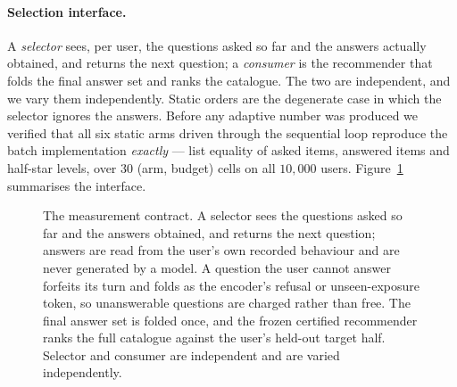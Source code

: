 \documentclass[11pt]{article}
\begin{document}
\paragraph{Selection interface.} A \emph{selector} sees, per user, the questions asked so far and
the answers actually obtained, and returns the next question; a \emph{consumer} is the recommender
that folds the final answer set and ranks the catalogue. The two are independent, and we vary them
independently. Static orders are the degenerate case in which the selector ignores the answers.
Before any adaptive number was produced we verified that all six static arms driven through the
sequential loop reproduce the batch implementation \emph{exactly} --- list equality of asked items,
answered items and half-star levels, over $30$ (arm, budget) cells on all $10{,}000$ users.
Figure~\ref{fig:contract} summarises the interface.


\begin{figure}[t]
\centering
{}
\caption{The measurement contract. A selector sees the questions asked so far and the answers
obtained, and returns the next question; answers are read from the user's own recorded behaviour and
are never generated by a model. A question the user cannot answer forfeits its turn and folds as the
encoder's refusal or unseen-exposure token, so unanswerable questions are charged rather than free.
The final answer set is folded once, and the frozen certified recommender ranks the full catalogue
against the user's held-out target half. Selector and consumer are independent and are varied
independently.}
\label{fig:contract}
\end{figure}
\end{document}
